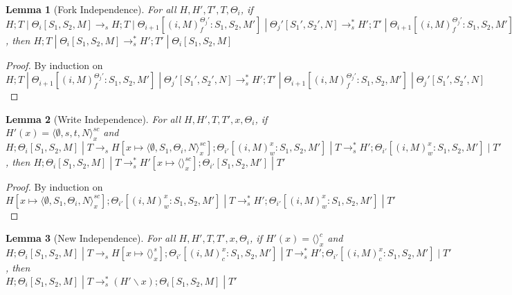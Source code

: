 \documentclass[9pt]{article}
\newtheorem{lemma}{Lemma}
\newcommand\specStep{\rightarrow_{s}}
\begin{document}
\begin{lemma}[Fork Independence]
\label{forkIndependence}
For all $H, H', T', T, \Theta_i$, if \\
$H; T \; | \; \Theta_i[S_1, S_2, M] \specStep H; T \; | \; \Theta_{i+1}[(i, M)_f^{\Theta_j'} : S_1, S_2, M'] \; | \; \Theta_j'[S_1', S_2', N] \specStep^* H'; T' \; | \; \Theta_{i+1}[(i, M)_f^{\Theta_j'} : S_1, S_2, M'] \; | \; \Theta_j'[S_1', S_2', N]$, then $H; T \; | \; \Theta_i[S_1, S_2, M] \specStep^* H'; T' \; | \; \Theta_i[S_1, S_2, M]$

\end{lemma}

\begin{proof}
By induction on $ H; T \; | \; \Theta_{i+1}[(i, M)_f^{\Theta_j'} : S_1, S_2, M'] \; | \; \Theta_j'[S_1', S_2', N] \specStep^* H'; T' \; | \; \Theta_{i+1}[(i, M)_f^{\Theta_j'} : S_1, S_2, M'] \; | \; \Theta_j'[S_1', S_2', N]$
\end{proof}

\begin{lemma}[Write Independence]
\label{writeIndependence}
For all $H, H', T, T', x, \Theta_i$, if $H'(x) = \langle \emptyset, s, t, N\rangle_x^{sc}$ and \\
$H;\Theta_i[S_1, S_2, M] \; | \; T \specStep H[x\mapsto \langle \emptyset, S_1, \Theta_i, N\rangle_x^{sc}]; \Theta_{i'}[(i, M)_w^x : S_1, S_2, M'] \; | \; T \specStep^* H'; \Theta_{i'}[(i, M)_w^x : S_1, S_2, M'] \; | \; T'$, then $H;\Theta_i[S_1, S_2, M] \; | \; T  \specStep^* H'[x\mapsto \langle\rangle_x^{sc}]; \Theta_{i'}[S_1, S_2, M'] \; | \; T'$
\end{lemma}

\begin{proof}
By induction on $H[x\mapsto \langle \emptyset, S_1, \Theta_i, N\rangle_x^{sc}]; \Theta_{i'}[(i, M)_w^x : S_1, S_2, M'] \; | \; T \specStep^* H'; \Theta_{i'}[(i, M)_w^x : S_1, S_2, M'] \; | \; T'$
\end{proof}

\begin{lemma}[New Independence]
\label{newIndependence}
For all $H, H', T, T', x, \Theta_i$, if $H'(x) = \langle\rangle_x^c$ and \\
$H; \Theta_i[S_1, S_2, M] \; | \; T \specStep H[x \mapsto \langle\rangle_x^s]; \Theta_{i'}[(i, M)_c^x : S_1, S_2, M'] \; | \; T \specStep^* H'; \Theta_{i'}[(i, M)_c^x : S_1, S_2, M'] \; | \; T'$, then\\
$H; \Theta_i[S_1, S_2, M] \; | \; T \specStep^* (H' \backslash x); \Theta_i[S_1, S_2, M] \; | \; T'$
\end{lemma}
\end{document}

